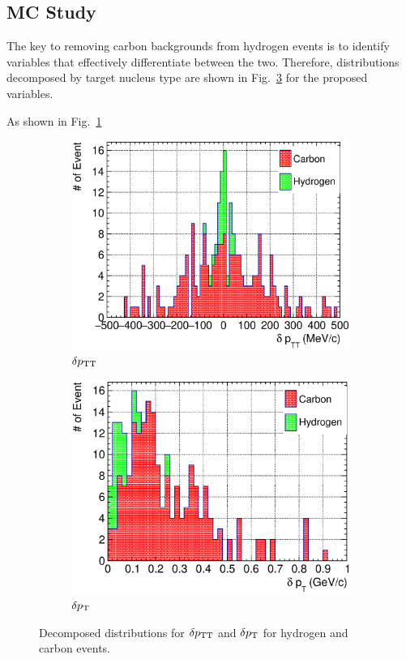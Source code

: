 \subsection{MC Study}
\label{sec:mc-hydrogen-ana}
     The key to removing carbon backgrounds from hydrogen events is to identify variables that effectively differentiate between the two.
     Therefore, distributions decomposed by target nucleus type are shown in Fig.~\ref{fig:hsel-tki-decomp} for the proposed variables.

     As shown in Fig.~\ref{subfig:hsel-dptt-stack}
     \begin{figure}
     \begin{subfigure}[b]{\dbfigwid\textwidth}
          \centering
          \includegraphics[width=\textwidth]{figures/perf/tki/SFGpTPCmu_dptt_stack_al15.eps}
          \caption{$\delta p_\textrm{TT}$}
          \label{subfig:hsel-dptt-stack}
     \end{subfigure}
     \begin{subfigure}[b]{\dbfigwid\textwidth}
          \centering
          \includegraphics[width=\textwidth]{figures/perf/tki/SFGpTPCmu_dpt_stack_al15.eps}
          \caption{$\delta p_\textrm{T}$}
          \label{subfig:hsel-dpt-stack}
     \end{subfigure}
     \caption{Decomposed distributions for $\delta p_\textrm{TT}$ and $\delta p_\textrm{T}$ for hydrogen and carbon events.}
     \label{fig:hsel-tki-decomp}
     \end{figure}

